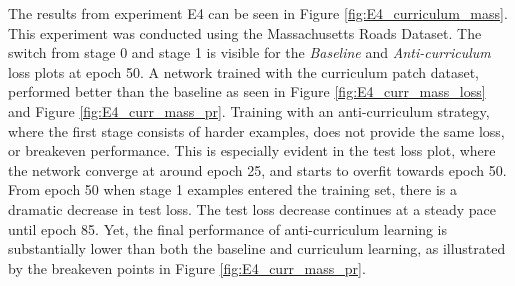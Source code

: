The results from experiment  E4 can be seen in Figure \ref{fig:E4_curriculum_mass}. This experiment was conducted using the Massachusetts Roads Dataset. The switch from stage 0 and stage 1 is visible for the \textit{Baseline} and \textit{Anti-curriculum} loss plots at epoch 50. A network trained with the curriculum patch dataset, performed better than the baseline as seen in Figure \ref{fig:E4_curr_mass_loss} and Figure \ref{fig:E4_curr_mass_pr}. Training with an anti-curriculum strategy, where the first stage consists of harder examples, does not provide the same loss, or breakeven performance. This is especially evident in the test loss plot, where the network converge at around epoch 25, and starts to overfit towards epoch 50. From epoch 50 when stage 1 examples entered the training set, there is a dramatic decrease in test loss. The test loss decrease continues at a steady pace until epoch 85. Yet, the final performance of anti-curriculum learning is substantially lower than both the baseline and curriculum learning, as illustrated by the breakeven points in Figure \ref{fig:E4_curr_mass_pr}.\\

